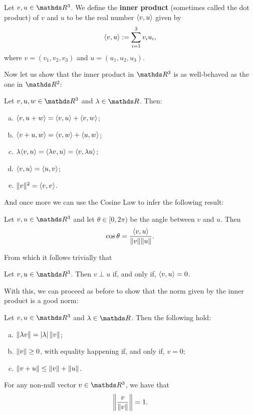 \begin{df}
	Let $v,u\in \R^3$. We define the \textbf{inner product} (sometimes called the dot product) of $v$ and $u$ to be the real number $\langle v,u\rangle$ given by
	\[\langle v,u\rangle:=\sum_{i=1}^3v_iu_i,\]where $v=(v_1,v_2,v_3)$ and $u=(u_1,u_2,u_3)$.
\end{df}

Now let us show that the inner product in $\R^3$ is as well-behaved as the one in $\R^2$:

\begin{prop}
	Let $v,u,w\in \R^3$ and $\lambda\in \R$. Then:
	\begin{enumerate}[a)]
		\item $\langle v,u+w\rangle=\langle v,u\rangle+\langle v,w\rangle$;
		\item $\langle v+u,w\rangle=\langle v,w\rangle+\langle u,w\rangle$;
		\item $\lambda \langle v,u\rangle=\langle \lambda v,u\rangle=\langle v,\lambda u\rangle$;
		\item $\langle v,u\rangle=\langle u,v\rangle$;
		\item $\lVert v\rVert^2=\langle v,v\rangle$.
	\end{enumerate}
\end{prop}

And once more we can use the Cosine Law to infer the following result:

\begin{lemma}
	Let $v,u\in \R^3$ and let $\theta\in[0,2\pi)$ be the angle between $v$ and $u$. Then 
	\[\cos\theta=\frac{\langle v,u\rangle}{\lVert v\rVert\lVert u\rVert}.\]
\end{lemma}

From which it follows trivially that
\begin{cor}
	Let $v,u\in \R^3$. Then $v\perp u$ if, and only if, $\langle v,u\rangle=0$.
\end{cor}

With this, we can proceed as before to show that the norm given by the inner product is a good norm:

\begin{prop}
	Let $v,u\in \R^3$ and $\lambda \in \R$. Then the following hold:
	\begin{enumerate}[a)]
		\item $\lVert\lambda v\rVert=\left\vert\lambda\right\vert\lVert v\rVert$;
		\item $\lVert v\rVert\geq 0$, with equality happening if, and only if, $v=0$;
		\item $\lVert v+u\rVert\leq\lVert v\rVert+\lVert u\rVert$.
	\end{enumerate}
\end{prop}
\begin{cor}
	For any non-null vector $v\in \R^3$, we have that \[\left\Vert\frac{v}{\lVert v\rVert}\right\Vert=1.\]
\end{cor}

